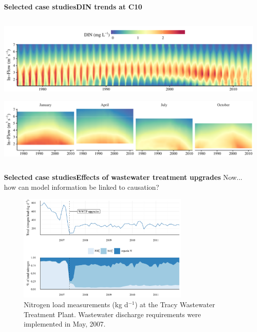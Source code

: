 \documentclass[serif]{beamer}\usepackage[]{graphicx}\usepackage[]{color}
\begin{document}
\begin{frame}{\textbf{Selected case studies}}{\textbf{DIN trends at C10}}
\begin{columns}
\begin{column}{0.35\textwidth}
\centerline{\includegraphics[width = \textwidth]{fig/c10grd1.pdf}}
\centerline{\includegraphics[width = \textwidth]{fig/c10grd2.pdf}}
\end{column}
\end{columns}
\end{frame}



\begin{frame}{\textbf{Selected case studies}}{\textbf{Effects of wastewater treatment upgrades}}
Now... how can model information be linked to causation?
\vspace{0.1in}
\begin{figure}
\centerline{\includegraphics[width = 0.75\textwidth]{fig/tracy.pdf}}
\caption{Nitrogen load measurements (kg d$^{-1}$) at the Tracy Wastewater Treatment Plant.  Wastewater discharge requirements were implemented in May, 2007.}
\end{figure}
\end{frame}
\end{document}
